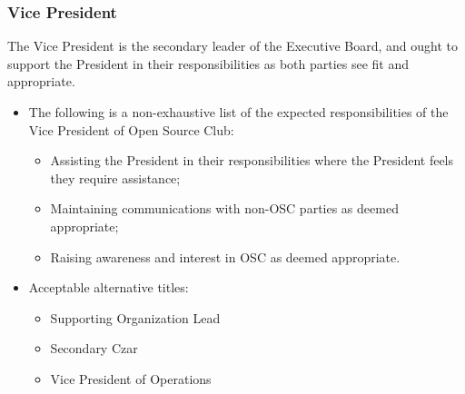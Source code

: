 \documentclass[12pt,letterpaper]{article}
\begin{document}
\subsubsection{Vice President}
The Vice President is the secondary leader of the Executive
Board, and ought to support the President in their responsibilities as both parties see
fit and appropriate.
\begin{itemize}
  \item The following is a non-exhaustive list of the expected responsibilities of the
    Vice President of Open Source Club:
    \begin{itemize}
      \item Assisting the President in their responsibilities where the President feels
        they require assistance;
      \item Maintaining communications with non-OSC parties as deemed appropriate;
      \item Raising awareness and interest in OSC as deemed appropriate.
    \end{itemize}
  \item Acceptable alternative titles:
    \begin{itemize}
      \item Supporting Organization Lead
      \item Secondary Czar
      \item Vice President of Operations
    \end{itemize}
\end{itemize}
\end{document}
